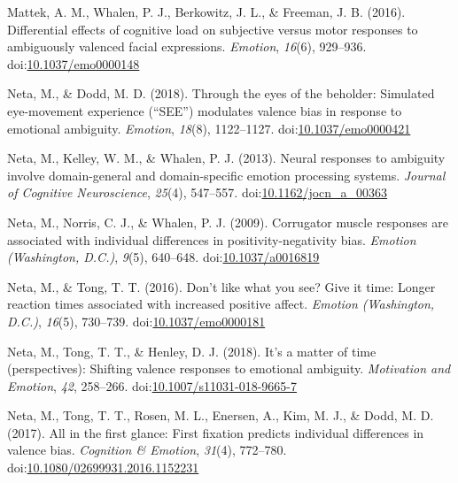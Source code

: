 \documentclass[man]{apa6}
\begin{document}
\leavevmode\hypertarget{ref-mattek_differential_2016}{}%
Mattek, A. M., Whalen, P. J., Berkowitz, J. L., \& Freeman, J. B. (2016). Differential effects of cognitive load on subjective versus motor responses to ambiguously valenced facial expressions. \emph{Emotion}, \emph{16}(6), 929--936. doi:\href{https://doi.org/10.1037/emo0000148}{10.1037/emo0000148}

\leavevmode\hypertarget{ref-neta_through_2018}{}%
Neta, M., \& Dodd, M. D. (2018). Through the eyes of the beholder: Simulated eye-movement experience (``SEE'') modulates valence bias in response to emotional ambiguity. \emph{Emotion}, \emph{18}(8), 1122--1127. doi:\href{https://doi.org/10.1037/emo0000421}{10.1037/emo0000421}

\leavevmode\hypertarget{ref-neta_neural_2013}{}%
Neta, M., Kelley, W. M., \& Whalen, P. J. (2013). Neural responses to ambiguity involve domain-general and domain-specific emotion processing systems. \emph{Journal of Cognitive Neuroscience}, \emph{25}(4), 547--557. doi:\href{https://doi.org/10.1162/jocn_a_00363}{10.1162/jocn\_a\_00363}

\leavevmode\hypertarget{ref-neta_corrugator_2009}{}%
Neta, M., Norris, C. J., \& Whalen, P. J. (2009). Corrugator muscle responses are associated with individual differences in positivity-negativity bias. \emph{Emotion (Washington, D.C.)}, \emph{9}(5), 640--648. doi:\href{https://doi.org/10.1037/a0016819}{10.1037/a0016819}

\leavevmode\hypertarget{ref-neta_dont_2016}{}%
Neta, M., \& Tong, T. T. (2016). Don't like what you see? Give it time: Longer reaction times associated with increased positive affect. \emph{Emotion (Washington, D.C.)}, \emph{16}(5), 730--739. doi:\href{https://doi.org/10.1037/emo0000181}{10.1037/emo0000181}

\leavevmode\hypertarget{ref-neta_its_2018}{}%
Neta, M., Tong, T. T., \& Henley, D. J. (2018). It's a matter of time (perspectives): Shifting valence responses to emotional ambiguity. \emph{Motivation and Emotion}, \emph{42}, 258--266. doi:\href{https://doi.org/10.1007/s11031-018-9665-7}{10.1007/s11031-018-9665-7}

\leavevmode\hypertarget{ref-neta_all_2017}{}%
Neta, M., Tong, T. T., Rosen, M. L., Enersen, A., Kim, M. J., \& Dodd, M. D. (2017). All in the first glance: First fixation predicts individual differences in valence bias. \emph{Cognition \& Emotion}, \emph{31}(4), 772--780. doi:\href{https://doi.org/10.1080/02699931.2016.1152231}{10.1080/02699931.2016.1152231}
\end{document}
